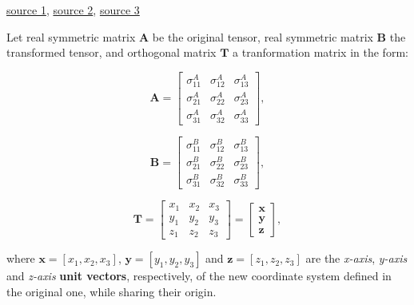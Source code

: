 \href{https://wp.optics.arizona.edu/optomech/wp-content/uploads/sites/53/2016/10/OPTI_222_W21.pdf}{source 1},
\href{https://www.continuummechanics.org/principalstressesandstrains.html}{source 2},
\href{https://www.ecourses.ou.edu/cgi-bin/eBook.cgi?doc=&topic=me&chap_sec=07.2&page=theory}{source 3}

Let real symmetric matrix  $\mathbf{A}$ be the original tensor,
real symmetric matrix $\mathbf{B}$ the transformed tensor, and
orthogonal matrix $\mathbf{T}$ a tranformation matrix in the form:

\begin{equation}
    \mathbf{A} = \begin{bmatrix}
        \sigma^{A}_{11} & \sigma^{A}_{12} & \sigma^{A}_{13} \\
        \sigma^{A}_{21} & \sigma^{A}_{22} & \sigma^{A}_{23} \\
        \sigma^{A}_{31} & \sigma^{A}_{32} & \sigma^{A}_{33}
    \end{bmatrix}
,\end{equation}

\begin{equation}
    \mathbf{B} = \begin{bmatrix}
        \sigma^{B}_{11} & \sigma^{B}_{12} & \sigma^{B}_{13} \\
        \sigma^{B}_{21} & \sigma^{B}_{22} & \sigma^{B}_{23} \\
        \sigma^{B}_{31} & \sigma^{B}_{32} & \sigma^{B}_{33}
    \end{bmatrix}
,\end{equation}

\begin{equation}
    \mathbf{T} = \begin{bmatrix}
        x_1 & x_2 & x_3 \\
        y_1 & y_2 & y_3 \\
        z_1 & z_2 & z_3
    \end{bmatrix} = \begin{bmatrix}
        \mathbf{x} \\
        \mathbf{y} \\
        \mathbf{z}
    \end{bmatrix}
,\end{equation}

where $\mathbf{x} = [x_1, x_2, x_3]$, $\mathbf{y} = [y_1, y_2, y_3]$ and
$\mathbf{z} = [z_1, z_2, z_3]$ are the \textit{x-axis}, \textit{y-axis} and
\textit{z-axis} \textbf{unit vectors}, respectively, of the new coordinate
system defined in the original one, while sharing their origin.

